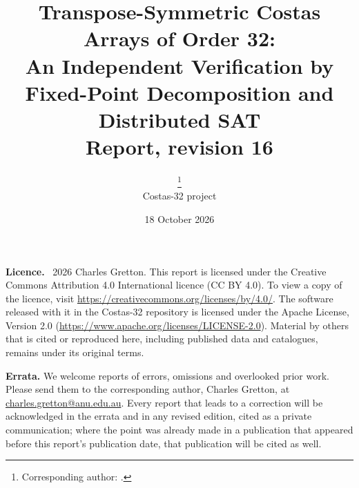 \documentclass[11pt,a4paper]{article}
\title{Transpose-Symmetric Costas Arrays of Order 32:\\
An Independent Verification by Fixed-Point Decomposition and Distributed SAT\\[4pt]
\large Report, revision 16}
\author{\AuthorName\thanks{Corresponding author: \AuthorEmail.}\\ Costas-32 project}
\date{18 October 2026}
\theoremstyle{definition}
\begin{document}
\maketitle

\begin{center}\begin{minipage}{0.9\textwidth}\small
\noindent\textbf{Licence.} \textcopyright\ 2026 Charles Gretton. This report is licensed under the Creative Commons Attribution 4.0 International licence (CC BY 4.0).
To view a copy of the licence, visit \url{https://creativecommons.org/licenses/by/4.0/}. The software released
with it in the Costas-32 repository is licensed under the Apache License, Version 2.0
(\url{https://www.apache.org/licenses/LICENSE-2.0}). Material by others that is cited or reproduced here,
including published data and catalogues, remains under its original terms.

\smallskip\noindent\textbf{Errata.} We welcome reports of errors, omissions and overlooked prior work. Please send them to the
corresponding author, Charles Gretton, at \href{mailto:charles.gretton@anu.edu.au}{charles.gretton@anu.edu.au}.
Every report that leads to a correction will be acknowledged in the errata and in any revised edition,
cited as a private communication; where the point was already made in a publication that appeared before
this report's publication date, that publication will be cited as well.
\end{minipage}\end{center}
\end{document}
